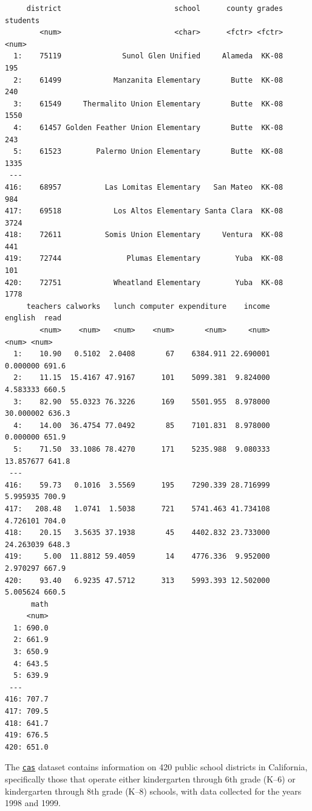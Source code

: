 \documentclass[
  12pt,
  letterpaper,
]{scrbook}
\theoremstyle{plain}
\theoremstyle{definition}
\theoremstyle{remark}
\begin{document}
\begin{verbatim}
     district                          school      county grades students
        <num>                          <char>      <fctr> <fctr>    <num>
  1:    75119              Sunol Glen Unified     Alameda  KK-08      195
  2:    61499            Manzanita Elementary       Butte  KK-08      240
  3:    61549     Thermalito Union Elementary       Butte  KK-08     1550
  4:    61457 Golden Feather Union Elementary       Butte  KK-08      243
  5:    61523        Palermo Union Elementary       Butte  KK-08     1335
 ---                                                                     
416:    68957          Las Lomitas Elementary   San Mateo  KK-08      984
417:    69518            Los Altos Elementary Santa Clara  KK-08     3724
418:    72611          Somis Union Elementary     Ventura  KK-08      441
419:    72744               Plumas Elementary        Yuba  KK-08      101
420:    72751            Wheatland Elementary        Yuba  KK-08     1778
     teachers calworks   lunch computer expenditure    income   english  read
        <num>    <num>   <num>    <num>       <num>     <num>     <num> <num>
  1:    10.90   0.5102  2.0408       67    6384.911 22.690001  0.000000 691.6
  2:    11.15  15.4167 47.9167      101    5099.381  9.824000  4.583333 660.5
  3:    82.90  55.0323 76.3226      169    5501.955  8.978000 30.000002 636.3
  4:    14.00  36.4754 77.0492       85    7101.831  8.978000  0.000000 651.9
  5:    71.50  33.1086 78.4270      171    5235.988  9.080333 13.857677 641.8
 ---                                                                         
416:    59.73   0.1016  3.5569      195    7290.339 28.716999  5.995935 700.9
417:   208.48   1.0741  1.5038      721    5741.463 41.734108  4.726101 704.0
418:    20.15   3.5635 37.1938       45    4402.832 23.733000 24.263039 648.3
419:     5.00  11.8812 59.4059       14    4776.336  9.952000  2.970297 667.9
420:    93.40   6.9235 47.5712      313    5993.393 12.502000  5.005624 660.5
      math
     <num>
  1: 690.0
  2: 661.9
  3: 650.9
  4: 643.5
  5: 639.9
 ---      
416: 707.7
417: 709.5
418: 641.7
419: 676.5
420: 651.0
\end{verbatim}

The
\href{https://www.rdocumentation.org/packages/AER/versions/1.2-15/topics/CASchools}{\texttt{cas}}
dataset contains information on 420 public school districts in
California, specifically those that operate either kindergarten through
6th grade (K--6) or kindergarten through 8th grade (K--8) schools, with
data collected for the years 1998 and 1999.
\end{document}
